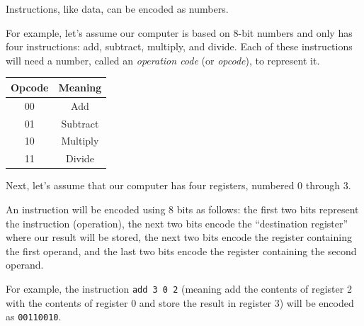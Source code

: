\documentclass[8pt,a4paper,compress,handout]{beamer}
\begin{document}
\begin{frame}[fragile]
Instructions, like data, can be encoded as numbers.

\bigskip

For example, let's assume our computer is based on 8-bit numbers and only has four instructions: add, subtract, multiply, and divide. Each of these instructions will need a number, called an \emph{operation code} (or \emph{opcode}), to represent it.
\begin{center}
\begin{tabular}{cc}
Opcode & Meaning \\ \hline
00 & Add \\
01 & Subtract \\ 
10 & Multiply \\
11 & Divide
\end{tabular}
\end{center}

\bigskip

Next, let's assume that our computer has four registers, numbered 0 through 3.

\bigskip

An instruction will be encoded using 8 bits as follows: the first two bits represent the instruction (operation), the next two bits encode the ``destination register'' where our result will be stored, the next two bits encode the register containing the first operand, and the last two bits encode the register containing the second operand. 

\bigskip

For example, the instruction \lstinline{add 3 0 2} (meaning add the contents of register 2 with the contents of register 0 and store the result in register 3) will be encoded as \lstinline{00110010}.
\end{frame}
\end{document}
